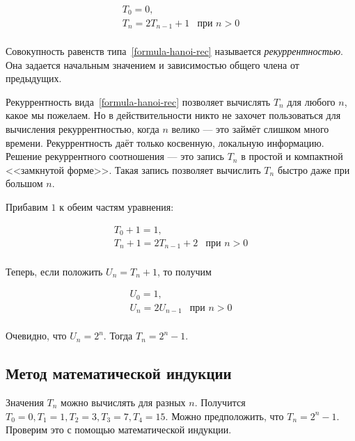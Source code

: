 \documentclass[14pt,openany]{book}
\begin{document}
\begin{equation}
\label{formula-hanoi-rec}
\begin{array}{ll}
T_0 = 0, \\
T_n = 2T_{n-1} + 1 & \text{при } n > 0 \\
\end{array}
\end{equation}

Совокупность равенств типа~\ref{formula-hanoi-rec} называется \emph{рекуррентностью}. Она задается
начальным значением и зависимостью общего члена от предыдущих.

Рекуррентность вида~\ref{formula-hanoi-rec} позволяет вычислять $T_n$ для любого $n$, какое мы пожелаем. Но в действительности
никто не захочет пользоваться для вычисления рекуррентностью, когда $n$ велико --- это займёт
слишком много времени. Рекуррентность даёт только косвенную, локальную информацию.
Решение рекуррентного соотношения --- это запись $T_n$ в простой и компактной
<<замкнутой форме>>. Такая запись позволяет вычислить $T_n$ быстро даже при большом $n$.

Прибавим $1$ к обеим частям уравнения:

\begin{equation}
\begin{array}{ll}
T_0 + 1 = 1, \\
T_n + 1 = 2T_{n-1} + 2 & \text{при } n > 0 \\
\end{array}
\end{equation}

Теперь, если положить $U_n = T_n + 1$, то получим 

\begin{equation}
\begin{array}{ll}
U_0 = 1, \\
U_n = 2U_{n-1} & \text{при } n > 0 \\
\end{array}
\end{equation}

Очевидно, что $U_n = 2^n$. Тогда $T_n = 2^n - 1$.


\subsection{Метод математической индукции}

Значения $T_n$ можно вычислять для разных $n$. Получится $T_0=0, T_1=1, T_2=3, T_3=7, T_4=15$.
Можно предположить, что $T_n=2^n-1$. Проверим это с помощью математической индукции.
\end{document}
